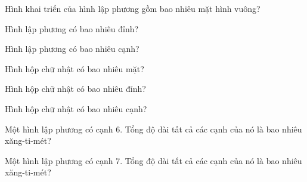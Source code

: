 
\begin{ex}
  Hình khai triển của hình lập phương gồm bao nhiêu mặt hình vuông?
\end{ex}

\begin{ex}
  Hình lập phương có bao nhiêu đỉnh?
\end{ex}

\begin{ex}
  Hình lập phương có bao nhiêu cạnh?
\end{ex}

\begin{ex}
  Hình hộp chữ nhật có bao nhiêu mặt?
\end{ex}

\begin{ex}
  Hình hộp chữ nhật có bao nhiêu đỉnh?
\end{ex}

\begin{ex}
  Hình hộp chữ nhật có bao nhiêu cạnh?
\end{ex}

\begin{ex}
  Một hình lập phương có cạnh 6. Tổng độ dài tất cả các cạnh của nó là bao nhiêu xăng-ti-mét?
\end{ex}

\begin{ex}
  Một hình lập phương có cạnh 7. Tổng độ dài tất cả các cạnh của nó là bao nhiêu xăng-ti-mét?
\end{ex}

